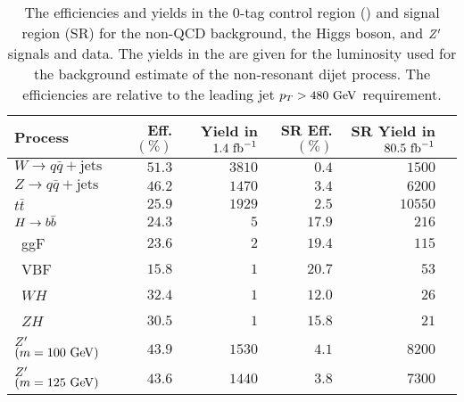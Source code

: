 \begin{table}[htpb]
 \centering
 \caption[Efficiencies and yields of resonant backgrounds and the signal processes.]{%
  The efficiencies and yields in the $0$-tag control region (\CRQCD{}) and signal region (SR) for the non-QCD background, the Higgs boson, and $Z'$ signals and data.
  The yields in the \CRQCD{} are given for the luminosity used for the background estimate of the non-resonant dijet process.
  The efficiencies are relative to the leading \largeR{} jet $p_{T} > 480~\mathrm{GeV}$ requirement.}
 \begin{adjustbox}{max width=\textwidth}
  \begin{tabular}{@{}lrrrrr@{}}
   \toprule
   Process                             & \CRQCD{} Eff. $(\%)$ & \CRQCD{} Yield in $1.4~\mathrm{fb}^{-1}$ & SR Eff. $(\%)$ & SR Yield in $80.5~\mathrm{fb}^{-1}$ \\ \midrule
   $W \to q\bar{q} + \mathrm{jets}$    & $51.3$               & $3810$                       & $0.4$          & $1500$                  \\
   $Z \to q\bar{q} + \mathrm{jets}$    & $46.2$               & $1470$                       & $3.4$          & $6200$                  \\
   $t\bar{t}$                          & $25.9$               & $1929$                       & $2.5$          & $10550$                 \\
   $\Hbb$                              & $24.3$               & $5$                          & $17.9$         & $216$                   \\
   \phantom{$\Hbb$\quad}~ggF           & $23.6$               & $2$                          & $19.4$         & $115$                   \\
   \phantom{$\Hbb$\quad}~VBF           & $15.8$               & $1$                          & $20.7$         & $53$                    \\
   \phantom{$\Hbb$\quad}~$WH$          & $32.4$               & $1$                          & $12.0$         & $26$                    \\
   \phantom{$\Hbb$\quad}~$ZH$          & $30.5$               & $1$                          & $15.8$         & $21$                    \\
   $Z'$ $\left(m=100~\mathrm{GeV}\right)$ & $43.9$               & $1530$                       & $4.1$          & $8200$                  \\
   $Z'$ $\left(m=125~\mathrm{GeV}\right)$ & $43.6$               & $1440$                       & $3.8$          & $7300$                  \\

\end{tabular}
\end{adjustbox}
\end{table}
